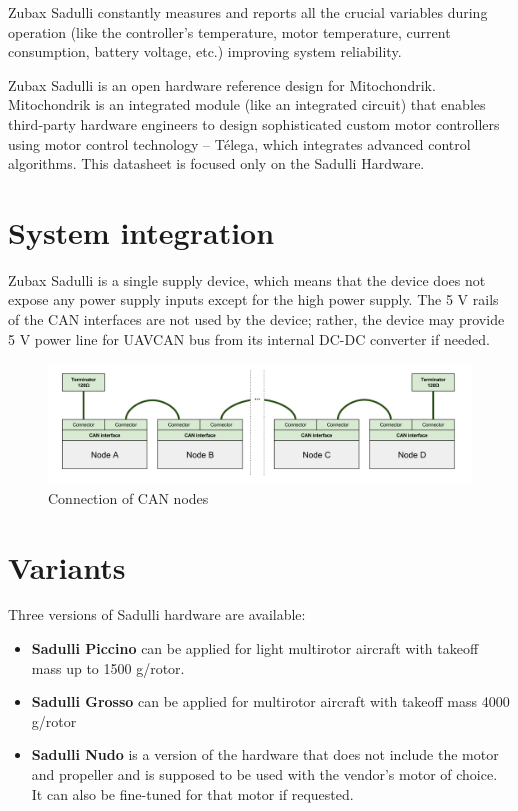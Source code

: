 \documentclass{document_templates/documentation_template_latex/zubaxdoc}
\begin{document}
Zubax Sadulli constantly measures and reports all the crucial variables during operation (like the controller’s temperature, motor temperature, current consumption, battery voltage, etc.) improving system reliability.

Zubax Sadulli is an open hardware reference design for Mitochondrik.
Mitochondrik is an integrated module (like an integrated circuit) that enables third-party hardware engineers to design sophisticated custom motor controllers using motor control technology – T\'elega, which integrates advanced control algorithms. This datasheet is focused only on the Sadulli Hardware.

\section{System integration}
Zubax Sadulli is a single supply device, which means that the device does not expose any power supply inputs except for the high power supply. The 5 V rails of the CAN interfaces are not used by the device; rather, the device may provide 5 V power line for UAVCAN bus from its internal DC-DC converter if needed.

\begin{figure}[h]
    \centering
    \includegraphics[width=1\textwidth]{figures/can_integration.png}
    \caption{Connection of CAN nodes}
\end{figure}

\section{Variants}

Three versions of Sadulli hardware are available:
\begin{itemize}
    \item \textbf{Sadulli Piccino} can be applied for light multirotor aircraft with takeoff mass up to 1500 g/rotor. 
    \item \textbf{Sadulli Grosso} can be applied for multirotor aircraft with takeoff mass 4000 g/rotor
    \item \textbf{Sadulli Nudo} is a version of the hardware that does not include the motor and propeller and is supposed to be used with the vendor's motor of choice. It can also be fine-tuned for that motor if requested.
\end{itemize}
\end{document}
